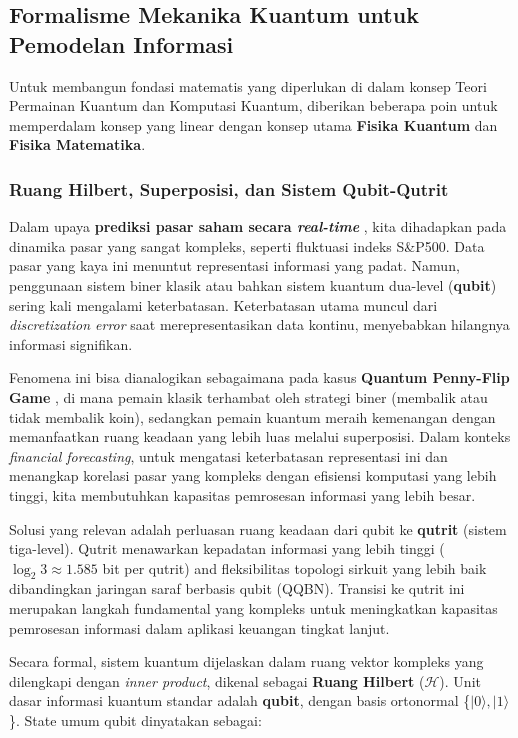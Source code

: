 \subsection{Formalisme Mekanika Kuantum untuk Pemodelan Informasi}
Untuk membangun fondasi matematis yang diperlukan di dalam konsep Teori Permainan Kuantum dan Komputasi Kuantum, diberikan beberapa poin untuk memperdalam konsep yang linear dengan konsep utama \textbf{Fisika Kuantum} dan \textbf{Fisika Matematika}.

\subsubsection{Ruang Hilbert, Superposisi, dan Sistem Qubit-Qutrit}

Dalam upaya \textbf{prediksi pasar saham secara \textit{real-time}} \citep{bakshi_quantum_2025}, kita dihadapkan pada dinamika pasar yang sangat kompleks, seperti fluktuasi indeks S\&P500. Data pasar yang kaya ini menuntut representasi informasi yang padat. Namun, penggunaan sistem biner klasik atau bahkan sistem kuantum dua-level (\textbf{qubit}) sering kali mengalami keterbatasan. Keterbatasan utama muncul dari \textit{discretization error} saat merepresentasikan data kontinu, menyebabkan hilangnya informasi signifikan.

Fenomena ini bisa dianalogikan sebagaimana pada kasus \textbf{Quantum Penny-Flip Game} \citep{meyer_quantum_1999}, di mana pemain klasik terhambat oleh strategi biner (membalik atau tidak membalik koin), sedangkan pemain kuantum meraih kemenangan dengan memanfaatkan ruang keadaan yang lebih luas melalui superposisi. Dalam konteks \textit{financial forecasting}, untuk mengatasi keterbatasan representasi ini dan menangkap korelasi pasar yang kompleks dengan efisiensi komputasi yang lebih tinggi, kita membutuhkan kapasitas pemrosesan informasi yang lebih besar.

Solusi yang relevan adalah perluasan ruang keadaan dari qubit ke \textbf{qutrit} (sistem tiga-level). Qutrit menawarkan kepadatan informasi yang lebih tinggi ($\log_2 3 \approx 1.585$ bit per qutrit) and fleksibilitas topologi sirkuit yang lebih baik dibandingkan jaringan saraf berbasis qubit (QQBN). Transisi ke qutrit ini merupakan langkah fundamental yang kompleks untuk meningkatkan kapasitas pemrosesan informasi dalam aplikasi keuangan tingkat lanjut.

Secara formal, sistem kuantum dijelaskan dalam ruang vektor kompleks yang dilengkapi dengan \textit{inner product}, dikenal sebagai \textbf{Ruang Hilbert} ($\mathcal{H}$). Unit dasar informasi kuantum standar adalah \textbf{qubit}, dengan basis ortonormal \{$|0\rangle, |1\rangle$\}. State umum qubit dinyatakan sebagai:

